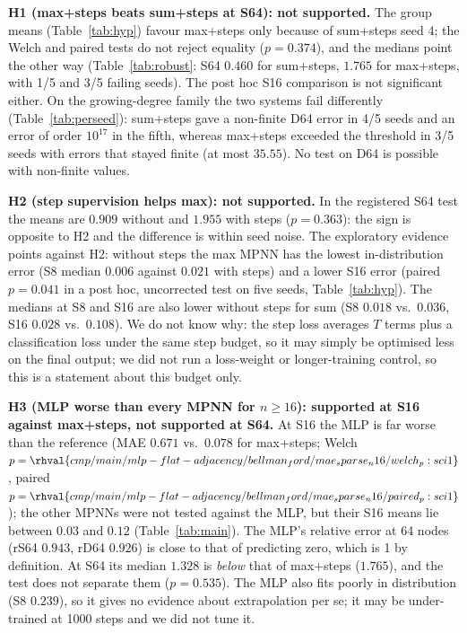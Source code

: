 \textbf{H1 (max+steps beats sum+steps at S64): not supported.} The group means (Table~\ref{tab:hyp}) favour max+steps only because of sum+steps seed 4; the Welch and paired tests do not reject equality ($p=0.374$), and the medians point the other way (Table~\ref{tab:robust}: S64 $0.460$ for sum+steps, $1.765$ for max+steps, with 1/5 and 3/5 failing seeds). The post hoc S16 comparison is not significant either. On the growing-degree family the two systems fail differently (Table~\ref{tab:perseed}): sum+steps gave a non-finite D64 error in 4/5 seeds and an error of order $10^{17}$ in the fifth, whereas max+steps exceeded the threshold in 3/5 seeds with errors that stayed finite (at most $35.55$). No test on D64 is possible with non-finite values.

\textbf{H2 (step supervision helps max): not supported.} In the registered S64 test the means are $0.909$ without and $1.955$ with steps ($p=0.363$): the sign is opposite to H2 and the difference is within seed noise. The exploratory evidence points against H2: without steps the max MPNN has the lowest in-distribution error (S8 median $0.006$ against $0.021$ with steps) and a lower S16 error (paired $p=0.041$ in a post hoc, uncorrected test on five seeds, Table~\ref{tab:hyp}). The medians at S8 and S16 are also lower without steps for sum (S8 $0.018$ vs.\ $0.036$, S16 $0.028$ vs.\ $0.108$). We do not know why: the step loss averages $T$ terms plus a classification loss under the same step budget, so it may simply be optimised less on the final output; we did not run a loss-weight or longer-training control, so this is a statement about this budget only.

\textbf{H3 (MLP worse than every MPNN for $n\ge16$): supported at S16 against max+steps, not supported at S64.} At S16 the MLP is far worse than the reference (MAE $0.671$ vs.\ $0.078$ for max+steps; Welch $p=\rhval{cmp/main/mlp-flat-adjacency/bellman_ford/mae_sparse_n16/welch_p:sci1}$, paired $p=\rhval{cmp/main/mlp-flat-adjacency/bellman_ford/mae_sparse_n16/paired_p:sci1}$); the other MPNNs were not tested against the MLP, but their S16 means lie between $0.03$ and $0.12$ (Table~\ref{tab:main}). The MLP's relative error at 64 nodes (rS64 $0.943$, rD64 $0.926$) is close to that of predicting zero, which is 1 by definition. At S64 its median $1.328$ is \emph{below} that of max+steps ($1.765$), and the test does not separate them ($p=0.535$). The MLP also fits poorly in distribution (S8 $0.239$), so it gives no evidence about extrapolation per se; it may be under-trained at 1000 steps and we did not tune it.

